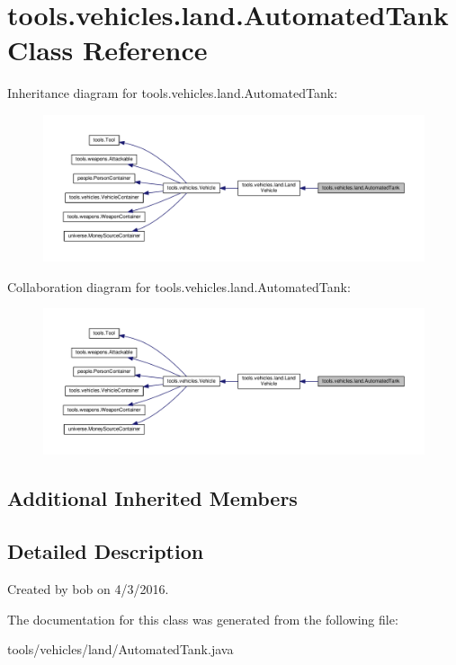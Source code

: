 \hypertarget{classtools_1_1vehicles_1_1land_1_1_automated_tank}{}\section{tools.\+vehicles.\+land.\+Automated\+Tank Class Reference}
\label{classtools_1_1vehicles_1_1land_1_1_automated_tank}


Inheritance diagram for tools.\+vehicles.\+land.\+Automated\+Tank\+:\nopagebreak
\begin{figure}[H]
\begin{center}
\leavevmode
\includegraphics[width=350pt]{classtools_1_1vehicles_1_1land_1_1_automated_tank__inherit__graph}
\end{center}
\end{figure}


Collaboration diagram for tools.\+vehicles.\+land.\+Automated\+Tank\+:\nopagebreak
\begin{figure}[H]
\begin{center}
\leavevmode
\includegraphics[width=350pt]{classtools_1_1vehicles_1_1land_1_1_automated_tank__coll__graph}
\end{center}
\end{figure}
\subsection*{Additional Inherited Members}


\subsection{Detailed Description}
Created by bob on 4/3/2016. 

The documentation for this class was generated from the following file\+:\begin{DoxyCompactItemize}
\item 
tools/vehicles/land/Automated\+Tank.\+java\end{DoxyCompactItemize}
